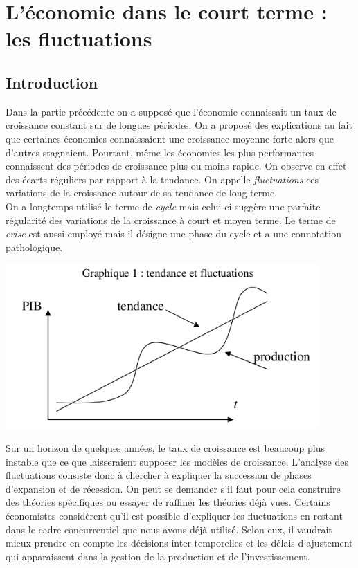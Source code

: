 \documentclass[10pt]{book}
\begin{document}
\part{L'économie dans le court terme : les fluctuations}
\chapter*{Introduction}
Dans la partie précédente on a supposé que l'économie connaissait un taux de croissance constant sur de longues périodes. On a proposé des explications au fait que certaines économies connaissaient une croissance moyenne forte alors que d'autres stagnaient. Pourtant, même les économies les plus performantes connaissent des périodes de croissance plus ou moins rapide. On observe en effet des écarts réguliers par rapport à la tendance. On appelle \textit{fluctuations} ces variations de la croissance autour de sa tendance de long terme. \\
On a longtemps utilisé le terme de \textit{cycle} mais celui-ci suggère une parfaite régularité des variations de la croissance à court et moyen terme. Le terme de \textit{crise} est aussi employé mais il désigne une phase du cycle et a une connotation pathologique.
\begin{center}
  \includegraphics[width=12cm]{graph10.png}
\end{center}
Sur un horizon de quelques années, le taux de croissance est beaucoup plus instable que ce que laisseraient supposer les modèles de croissance. L'analyse des fluctuations consiste donc à chercher à expliquer la succession de phases d'expansion et de récession. On peut se demander s'il faut pour cela construire des théories spécifiques ou essayer de raffiner les théories déjà vues. Certains économistes considèrent qu'il est possible d'expliquer les fluctuations en restant dans le cadre concurrentiel que nous avons déjà utilisé. Selon eux, il vaudrait mieux prendre en compte les décisions inter-temporelles et les délais d'ajustement qui apparaissent dans la gestion de la production et de l'investissement. \\
\end{document}
